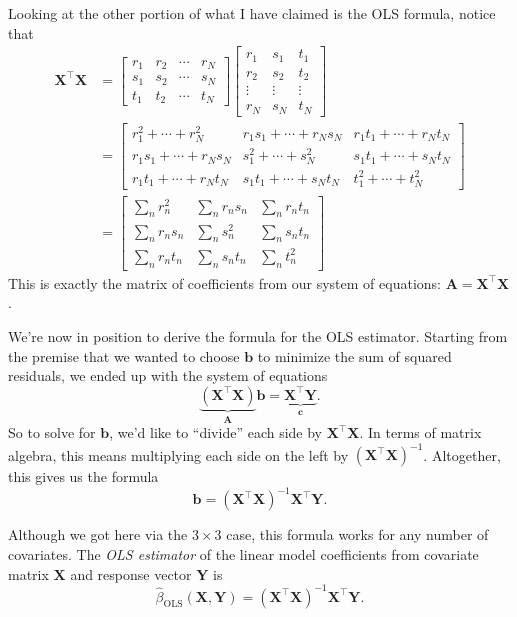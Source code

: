 \documentclass[
  12pt,
  oneside,openany]{book}
\begin{document}
Looking at the other portion of what I have claimed is the OLS formula, notice that
\[
\begin{aligned}
\mathbf{X}^\top \mathbf{X}
&= \begin{bmatrix}
r_1 & r_2 & \cdots & r_N \\
s_1 & s_2 & \cdots & s_N \\
t_1 & t_2 & \cdots & t_N
\end{bmatrix} \begin{bmatrix}
r_1 & s_1 & t_1 \\
r_2 & s_2 & t_2 \\
\vdots & \vdots & \vdots \\
r_N & s_N & t_N
\end{bmatrix} \\
&= \begin{bmatrix}
r_1^2 + \cdots + r_N^2 & r_1 s_1 + \cdots + r_N s_N & r_1 t_1 + \cdots + r_N t_N \\
r_1 s_1 + \cdots + r_N s_N & s_1^2 + \cdots + s_N^2 & s_1 t_1 + \cdots + s_N t_N \\
r_1 t_1 + \cdots + r_N t_N & s_1 t_1 + \cdots + s_N t_N & t_1^2 + \cdots + t_N^2
\end{bmatrix} \\
&= \begin{bmatrix}
\sum_n r_n^2 & \sum_n r_n s_n & \sum_n r_n t_n \\
\sum_n r_n s_n & \sum_n s_n^2 & \sum_n s_n t_n \\
\sum_n r_n t_n & \sum_n s_n t_n & \sum_n t_n^2
\end{bmatrix}
\end{aligned}
\]
This is exactly the matrix of coefficients from our system of equations: \(\mathbf{A} = \mathbf{X}^\top \mathbf{X}\).

We're now in position to derive the formula for the OLS estimator.
Starting from the premise that we wanted to choose \(\mathbf{b}\) to minimize the sum of squared residuals, we ended up with the system of equations
\[
\underbrace{(\mathbf{X}^\top \mathbf{X})}_{\mathbf{A}} \mathbf{b} = \underbrace{\mathbf{X}^\top \mathbf{Y}}_{\mathbf{c}}.
\]
So to solve for \(\mathbf{b}\), we'd like to ``divide'' each side by \(\mathbf{X}^\top \mathbf{X}\).
In terms of matrix algebra, this means multiplying each side on the left by \((\mathbf{X}^\top \mathbf{X})^{-1}\).
Altogether, this gives us the formula
\[
\mathbf{b} = (\mathbf{X}^\top \mathbf{X})^{-1} \mathbf{X}^\top \mathbf{Y}.
\]

Although we got here via the \(3 \times 3\) case, this formula works for any number of covariates. The \emph{OLS estimator} of the linear model coefficients from covariate matrix \(\mathbf{X}\) and response vector \(\mathbf{Y}\) is
\[
\hat{\beta}_{\text{OLS}}(\mathbf{X}, \mathbf{Y})
= (\mathbf{X}^\top \mathbf{X})^{-1} \mathbf{X}^\top \mathbf{Y}.
\]
\end{document}
